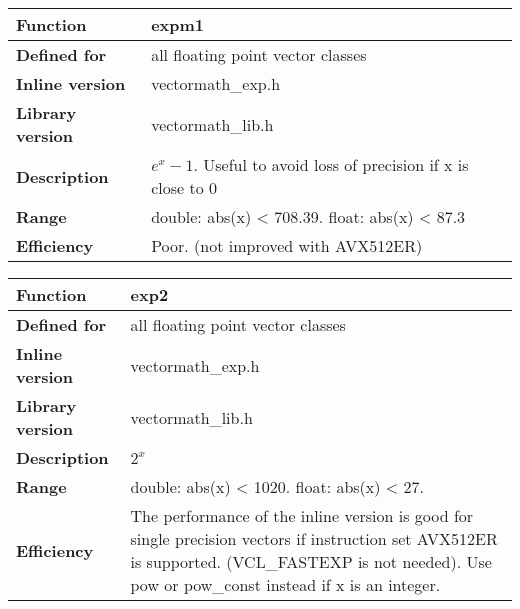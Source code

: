 \documentclass[vcl_manual.tex]{subfiles}
\begin{document}
\begin{tabular}{|p{30mm}|p{120mm}|}
\hline
\bfseries Function & expm1 \\ \hline
\bfseries Defined for & all floating point vector classes \\ \hline
\bfseries Inline version & vectormath\_exp.h \\ \hline
\bfseries Library version & vectormath\_lib.h \\ \hline
\bfseries Description & $e^x-1$. Useful to avoid loss of precision if x is close to 0 \\ \hline
\bfseries Range & double: abs(x) \textless{} 708.39. float: abs(x) \textless{} 87.3 \\ \hline
\bfseries Efficiency & Poor. (not improved with AVX512ER) \\ \hline
\end{tabular}


\begin{tabular}{|p{30mm}|p{120mm}|}
\hline
\bfseries Function & exp2 \\ \hline
\bfseries Defined for & all floating point vector classes \\ \hline
\bfseries Inline version & vectormath\_exp.h \\ \hline
\bfseries Library version & vectormath\_lib.h \\ \hline
\bfseries Description & $2^x$ \\ \hline
\bfseries Range & double: abs(x) \textless{} 1020. float: abs(x) \textless{} 27. \\ \hline
\bfseries Efficiency & The performance of the inline version is good for single precision vectors if instruction set AVX512ER is supported. (VCL\_FASTEXP is not needed). \newline
Use pow or pow\_const instead if x is an integer. \\ \hline
\end{tabular}
\end{document}
